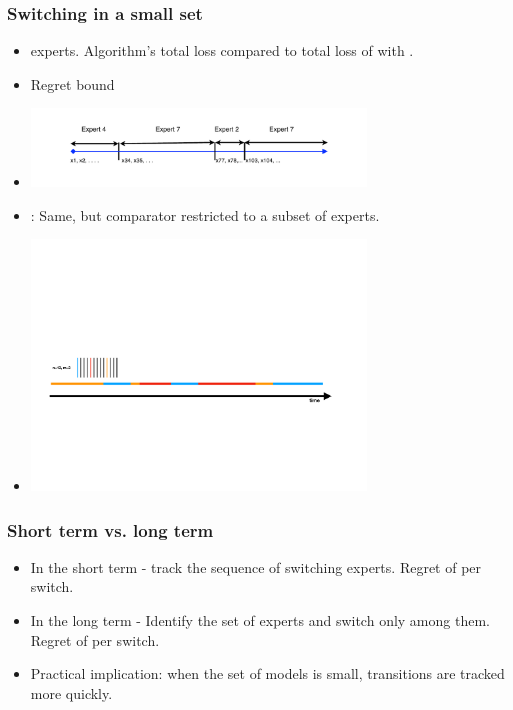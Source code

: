 \documentclass{beamer}
\begin{document}
\begin{frame}
\frametitle{Switching in a small set}
\begin{itemize}
\item {}  experts. Algorithm's total loss
  compared to total loss of  with 
  .
\item Regret bound 
\item \includegraphics[width=3.5in]{figures/SwitchingExperts.pdf}
\item {}: Same, but comparator restricted to
  a subset of  experts.
\item \includegraphics[width=3.5in]{figures/switchingSmallSet.pdf}
\end{itemize}
\end{frame}

\begin{frame}
\frametitle{Short term vs. long term}
\begin{itemize}
\item In the short term - track the sequence of switching
  experts. Regret of  per switch.
\item In the long term - Identify the set of  experts and
  switch only among them. Regret of  per switch.
\item Practical implication: when the set of models is small,
  transitions are tracked more quickly.
\end{itemize}
\end{frame}
\end{document}
